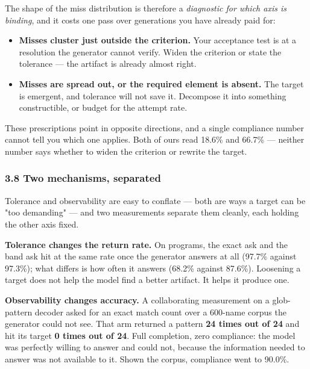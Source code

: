 \documentclass[
  10pt,
]{article}
\providecommand{\tightlist}{%
  \setlength{\itemsep}{0pt}\setlength{\parskip}{0pt}}
\theoremstyle{plain}
\theoremstyle{definition}
\providecommand{\tightlist}{\setlength{\itemsep}{0pt}\setlength{\parskip}{0pt}}
\begin{document}
The shape of the miss distribution is therefore a \emph{diagnostic for
which axis is binding}, and it costs one pass over generations you have
already paid for:

\begin{itemize}
\tightlist
\item
  \textbf{Misses cluster just outside the criterion.} Your acceptance
  test is at a resolution the generator cannot verify. Widen the
  criterion or state the tolerance --- the artifact is already almost
  right.
\item
  \textbf{Misses are spread out, or the required element is absent.} The
  target is emergent, and tolerance will not save it. Decompose it into
  something constructible, or budget for the attempt rate.
\end{itemize}

These prescriptions point in opposite directions, and a single
compliance number cannot tell you which one applies. Both of ours read
18.6\% and 66.7\% --- neither number says whether to widen the criterion
or rewrite the target.

\subsubsection{3.8 Two mechanisms,
separated}\label{38-two-mechanisms-separated}

Tolerance and observability are easy to conflate --- both are ways a
target can be "too demanding" --- and two measurements separate them
cleanly, each holding the other axis fixed.

\textbf{Tolerance changes the return rate.} On programs, the exact ask
and the band ask hit at the same rate once the generator answers at all
(97.7\% against 97.3\%); what differs is how often it answers (68.2\%
against 87.6\%). Loosening a target does not help the model find a
better artifact. It helps it produce one.

\textbf{Observability changes accuracy.} A collaborating measurement on
a glob-pattern decoder asked for an exact match count over a 600-name
corpus the generator could not see. That arm returned a pattern
\textbf{24 times out of 24} and hit its target \textbf{0 times out of
24}. Full completion, zero compliance: the model was perfectly willing
to answer and could not, because the information needed to answer was
not available to it. Shown the corpus, compliance went to 90.0\%.
\end{document}
